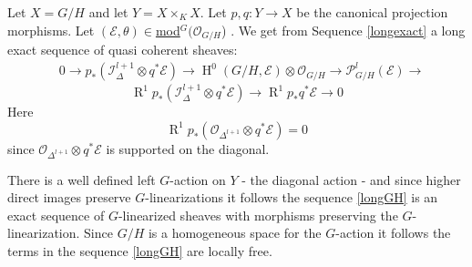 \documentclass{amsart}
\theoremstyle{plain}
\theoremstyle{definition}
\theoremstyle{remark}
\numberwithin{equation}{theorem}
\begin{document}
Let $X=G/H$ and let $Y=X\times_K X$. Let $p,q:Y\rightarrow X$ be the
canonical projection morphisms. Let $({\mathcal{E}},\theta)\in ${\underline{mod}$^G({\mathcal{O} }_{G/H}$) }. We get from
Sequence \ref{longexact} a long exact sequence of quasi coherent
sheaves:
\begin{align}
&\label{longGH} 0\rightarrow p_*({\mathcal{I}}_{\Delta}^{l+1}\otimes
q^*{\mathcal{E}})\rightarrow
{\operatorname{H} }^0(G/H,{\mathcal{E}})\otimes {\mathcal{O} }_{G/H} \rightarrow {\mathcal{P} }^l_{G/H}({\mathcal{E}}) \rightarrow
\end{align}
\[{\operatorname{R} }^1p_*({\mathcal{I}}_{\Delta}^{l+1}\otimes q^*{\mathcal{E}})\rightarrow {\operatorname{R} }^1p_*q^*{\mathcal{E}}
\rightarrow 0 \]
Here
\[ {\operatorname{R} }^1p_*({\mathcal{O} }_{\Delta^{l+1}}\otimes q^*{\mathcal{E}})=0 \]
since ${\mathcal{O} }_{\Delta^{l+1}}\otimes q^*{\mathcal{E}}$ is supported on the diagonal.

There is a well defined left $G$-action on $Y$ - the
diagonal action - and since higher direct images preserve
$G$-linearizations it follows the sequence \ref{longGH} is an exact
sequence of $G$-linearized sheaves with morphisms preserving the
$G$-linearization. Since $G/H$ is a homogeneous space for the
$G$-action it follows the terms in the sequence \ref{longGH} are
locally free.
\end{document}
